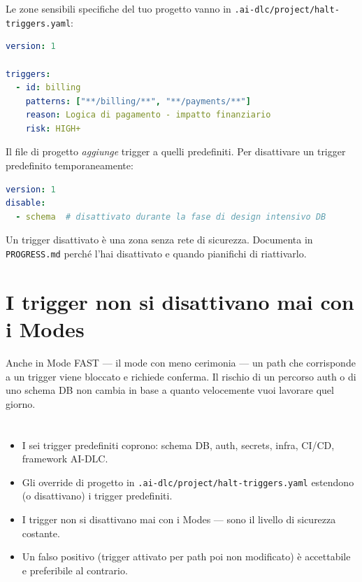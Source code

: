 Le zone sensibili specifiche del tuo progetto vanno in \texttt{.ai-dlc/project/halt-triggers.yaml}:

\begin{lstlisting}[language=yaml,caption={Override di progetto per TaskFlow API}]
version: 1

triggers:
  - id: billing
    patterns: ["**/billing/**", "**/payments/**"]
    reason: Logica di pagamento - impatto finanziario
    risk: HIGH+
\end{lstlisting}

Il file di progetto \textit{aggiunge} trigger a quelli predefiniti. Per disattivare un trigger predefinito temporaneamente:

\begin{lstlisting}[language=yaml,caption={Disattivazione temporanea del trigger schema}]
version: 1
disable:
  - schema  # disattivato durante la fase di design intensivo DB
\end{lstlisting}

\begin{warnbox}
Un trigger disattivato è una zona senza rete di sicurezza. Documenta in \texttt{PROGRESS.md} perché l'hai disattivato e quando pianifichi di riattivarlo.
\end{warnbox}

\section{I trigger non si disattivano mai con i Modes}
\label{sec:10-modes}

Anche in Mode FAST --- il mode con meno cerimonia --- un path che corrisponde a un trigger viene bloccato e richiede conferma. Il rischio di un percorso auth o di uno schema DB non cambia in base a quanto velocemente vuoi lavorare quel giorno.

\section*{\LabelSummary}

\begin{itemize}
  \item I sei trigger predefiniti coprono: schema DB, auth, secrets, infra, CI/CD, framework AI-DLC.
  \item Gli override di progetto in \texttt{.ai-dlc/project/halt-triggers.yaml} estendono (o disattivano) i trigger predefiniti.
  \item I trigger non si disattivano mai con i Modes --- sono il livello di sicurezza costante.
  \item Un falso positivo (trigger attivato per path poi non modificato) è accettabile e preferibile al contrario.
\end{itemize}
